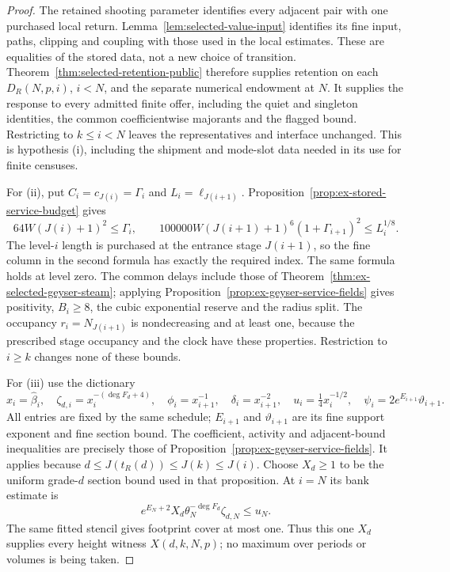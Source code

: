 \begin{proof}
The retained shooting parameter identifies every adjacent pair with
one purchased local return. Lemma~\ref{lem:selected-value-input}
identifies its fine input, paths, clipping and coupling with those
used in the local estimates. These are equalities of the stored data,
not a new choice of transition. Theorem~\ref{thm:selected-retention-public}
therefore supplies retention on each $D_R(N,p,i)$, $i<N$, and the
separate numerical endowment at $N$. It supplies the response to every
admitted finite offer, including the quiet and singleton identities,
the common coefficientwise majorants and the flagged bound. Restricting
to $k\le i<N$ leaves the representatives and interface unchanged. This is
hypothesis (i), including the shipment and mode-slot data needed in
its use for finite censuses.

For (ii), put $C_i=c_{J(i)}=\Gamma_i$ and
$L_i=\ell_{J(i+1)}$. Proposition~\ref{prop:ex-stored-service-budget}
gives
\[
 64W(J(i)+1)^2\le\Gamma_i,\qquad
 100000W(J(i+1)+1)^6(1+\Gamma_{i+1})^2\le L_i^{1/8}.
\]
The level-$i$ length is purchased at the entrance stage $J(i+1)$,
so the fine column in the second formula has exactly the required
index. The same formula holds at level zero. The common delays include
those of Theorem~\ref{thm:ex-selected-geyser-steam}; applying
Proposition~\ref{prop:ex-geyser-service-fields} gives positivity,
$B_i\ge8$, the cubic exponential reserve and the radius split.
The occupancy $r_i=N_{J(i+1)}$ is nondecreasing and at least one,
because the prescribed stage occupancy and the clock have these
properties. Restriction to $i\ge k$ changes none of these bounds.

For (iii) use the dictionary
\[
 x_i=\widehat\beta_i,\quad
 \zeta_{d,i}=x_i^{-(\deg F_d+4)},\quad
 \phi_i=x_{i+1}^{-1},\quad \delta_i=x_{i+1}^{-2},\quad
 u_i=\tfrac14x_i^{-1/2},\quad
 \psi_i=2e^{E_{i+1}}\vartheta_{i+1}.
\]
All entries are fixed by the same schedule; $E_{i+1}$ and
$\vartheta_{i+1}$ are its fine support exponent and fine section bound.
The coefficient, activity and adjacent-bound inequalities are precisely
those of Proposition~\ref{prop:ex-geyser-service-fields}. It applies
because $d\le J(t_R(d))\le J(k)\le J(i)$. Choose $X_d\ge1$ to be
the uniform grade-$d$ section bound used in that proposition.
At $i=N$ its bank estimate is
\[
 e^{E_N+2}X_d\theta_N^{-\deg F_d}\zeta_{d,N}\le u_N.
\]
The same fitted stencil gives footprint cover at most one. Thus this
one $X_d$ supplies every height witness $X(d,k,N,p)$; no maximum over
periods or volumes is being taken.


\end{proof}
